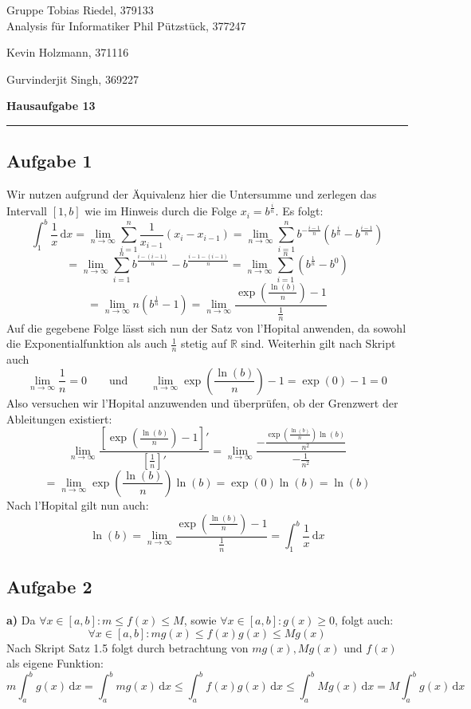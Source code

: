 \documentclass[a4paper,graphics,11pt]{article}
\newcommand{\aufgabe}[1]{\subsection*{Aufgabe #1}}
\begin{document}
\noindent Gruppe              \hfill Tobias Riedel, 379133 \\
\noindent Analysis für Informatiker             \hfill Phil Pützstück, 377247 \\
\strut\hfill Kevin Holzmann, 371116\\
\strut\hfill Gurvinderjit Singh, 369227
\begin{center}
	\LARGE{\textbf{Hausaufgabe  13}}
\end{center}
\begin{center}
\rule[0.1ex]{\textwidth}{1pt}
\end{center}



\aufgabe{1}
Wir nutzen aufgrund der Äquivalenz hier die Untersumme und zerlegen das Intervall $[1,b]$ wie im Hinweis
durch die Folge $x_i = b^{\frac{i}{n}}$. Es folgt:
$$
	\int_{1}^{b} \frac{1}{x}\, \mathrm{d}x
	= \lim_{n \to \infty} \sum_{i=1}^{n} \frac{1}{x_{i-1}}(x_i-x_{i-1})
	= \lim_{n \to \infty} \sum_{i=1}^{n} b^{-\frac{i-1}{n}}\left(b^{\frac{i}{n}} - b^{\frac{i-1}{n}}\right)
$$$$
	= \lim_{n \to \infty} \sum_{i=1}^{n} b^{\frac{i-(i-1)}{n}}-b^{\frac{i-1-(i-1)}{n}}
	= \lim_{n \to \infty} \sum_{i=1}^{n}\left(b^{\frac{1}{n}}-b^0\right)
$$$$
	= \lim_{n \to \infty} n\left(b^{\frac{1}{n}}-1\right)
	= \lim_{n \to \infty} \frac{\exp\left(\frac{\ln(b)}{n}\right)-1}{\frac{1}{n}}
$$
Auf die gegebene Folge lässt sich nun der Satz von l'Hopital anwenden, da sowohl die Exponentialfunktion 
als auch $\frac{1}{n}$ stetig auf $\mathbb{R}$ sind. Weiterhin gilt nach Skript auch
$$
	\lim_{n \to \infty} \frac{1}{n} = 0\qquad\text{und}\qquad
	\lim_{n \to \infty} \exp\left(\frac{\ln(b)}{n}\right)-1 = \exp(0)-1 = 0
$$
Also versuchen wir l'Hopital anzuwenden und überprüfen, ob der Grenzwert der Ableitungen existiert:
$$
	 \lim_{n \to \infty} \frac{\left[\exp\left(\frac{\ln(b)}{n}\right)-1\right]'}{\left[\frac{1}{n}\right]'}
	= \lim_{n \to \infty} \frac{-\frac{\exp\left(\frac{\ln(b)}{n}\right)\ln(b)}{n^2}}{-\frac{1}{n^2}}
$$$$
	= \lim_{n \to \infty} \exp\left(\frac{\ln(b)}{n}\right)\ln(b)
	= \exp(0)\ln(b) = \ln(b)
$$
Nach l'Hopital gilt nun auch:
$$
	\ln(b) = \lim_{n \to \infty} \frac{\exp\left(\frac{\ln(b)}{n}\right)-1}{\frac{1}{n}} = \int_{1}^{b} \frac{1}{x}\, \mathrm{d}x
$$

\newpage

\aufgabe{2}
\textbf{a)}
Da $\forall x \in [a,b] \colon m \leq f(x) \leq M$, sowie $\forall x \in [a,b]\colon g(x) \geq 0$, folgt auch:
$$
	\forall x \in [a,b] \colon mg(x)\leq f(x)g(x) \leq Mg(x)
$$
Nach Skript Satz 1.5 folgt durch betrachtung von $mg(x), Mg(x)$ und $f(x)$ als eigene Funktion:
$$
	m\int_{a}^{b} g(x)\, \mathrm{d}x
	= \int_{a}^{b} mg(x)\, \mathrm{d}x
	\leq \int_{a}^{b} f(x)g(x)\, \mathrm{d}x
	\leq \int_{a}^{b} Mg(x)\, \mathrm{d}x
	= M\int_{a}^{b} g(x)\, \mathrm{d}x
$$
\end{document}
